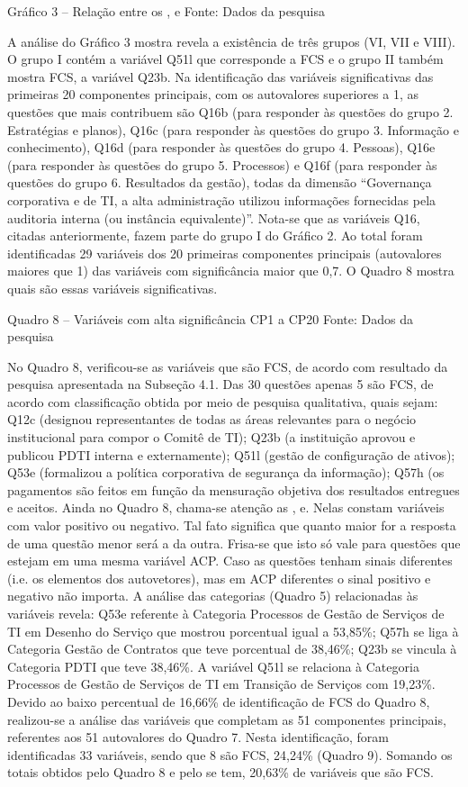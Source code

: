Gráfico 3 – Relação entre os ,  e 
Fonte: Dados da pesquisa

A análise do Gráfico 3 mostra revela a existência de três grupos (VI, VII e VIII). O grupo I contém a variável Q51l que corresponde a FCS e o grupo II também mostra FCS, a variável Q23b.
Na identificação das variáveis significativas das primeiras 20 componentes principais, com os autovalores superiores a 1, as questões que mais contribuem são Q16b (para responder às questões do grupo 2. Estratégias e planos), Q16c (para responder às questões do grupo 3. Informação e conhecimento), Q16d (para responder às questões do grupo 4. Pessoas), Q16e (para responder às questões do grupo 5. Processos) e Q16f (para responder às questões do grupo 6. Resultados da gestão), todas da dimensão “Governança corporativa e de TI, a alta administração utilizou informações fornecidas pela auditoria interna (ou instância equivalente)”. Nota-se que as variáveis Q16, citadas anteriormente, fazem parte do grupo I do Gráfico 2. Ao total foram identificadas 29 variáveis dos 20 primeiras componentes principais (autovalores maiores que 1) das variáveis com significância maior que 0,7. O Quadro 8 mostra quais são essas variáveis significativas. 

Quadro 8 – Variáveis com alta significância CP1 a CP20
Fonte: Dados da pesquisa

No Quadro 8, verificou-se as variáveis que são FCS, de acordo com resultado da pesquisa apresentada na Subseção 4.1. Das 30 questões apenas 5 são FCS, de acordo com classificação obtida por meio de pesquisa qualitativa, quais sejam: Q12c (designou representantes de todas as áreas relevantes para o negócio institucional para compor o Comitê de TI); Q23b (a instituição aprovou e  publicou PDTI interna e externamente); Q51l (gestão de configuração de ativos); Q53e (formalizou a política corporativa de segurança da informação); Q57h (os pagamentos são feitos em função da mensuração objetiva dos resultados entregues e aceitos.
Ainda no Quadro 8, chama-se atenção as ,  e. Nelas constam variáveis com valor positivo ou negativo. Tal fato significa que quanto maior for a resposta de uma questão menor será a da outra. Frisa-se que isto só vale para questões que estejam em uma mesma variável ACP. Caso as questões tenham sinais diferentes (i.e. os elementos dos autovetores), mas em ACP diferentes o sinal positivo e negativo não importa. 
A análise das categorias (Quadro 5) relacionadas às variáveis revela: Q53e referente à Categoria Processos de Gestão de Serviços de TI em Desenho do Serviço que mostrou porcentual igual a 53,85\%; Q57h se liga à Categoria Gestão de Contratos que teve porcentual de 38,46\%; Q23b se vincula à Categoria PDTI que teve 38,46\%. A variável Q51l se relaciona à Categoria Processos de Gestão de Serviços de TI em Transição de Serviços com 19,23\%.
Devido ao baixo percentual de 16,66\% de identificação de FCS do Quadro 8, realizou-se a análise das variáveis que completam as 51 componentes principais, referentes aos 51 autovalores do Quadro 7. Nesta identificação, foram identificadas 33 variáveis, sendo que 8 são FCS, 24,24\% (Quadro 9). Somando os totais obtidos pelo Quadro 8 e pelo se tem, 20,63\% de variáveis que são FCS.

